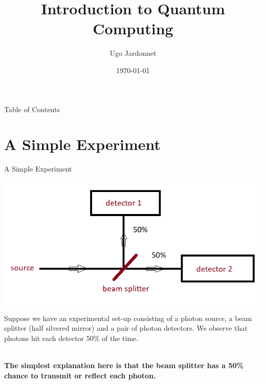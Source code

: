 \documentclass[svgnames,smaller,aspectratio=169]{beamer}
\title{Introduction to Quantum Computing}
\author{Ugo Jardonnet}
\date{\today}
\newcommand*{\cpp}{\texttt{C++}}
\newcommand*{\csharp}{\texttt{C\#}}
\begin{document}

\begin{frame}
  \titlepage
\end{frame}

\begin{frame}{Table of Contents}
  \tableofcontents
\end{frame}

\section{A Simple Experiment}


\newcommand{\iu}{\mathrm{i}\mkern1mu}

\begin{frame}[fragile]{A Simple Experiment \cite{interfer}}
   \begin{center}
      \includegraphics[height=.4\textheight]{exp1}
  \end{center}
  Suppose we have an experimental set-up consisting of a photon source, a beam splitter (half silvered mirror) and a
  pair of photon detectors.  We observe that photons hit each detector 50\% of the time. \\~\
  
  \noindent
  \textbf{The simplest explanation here is that the beam splitter has a 50\% chance to transmit or reflect each photon.}
\end{frame}
\end{document}
